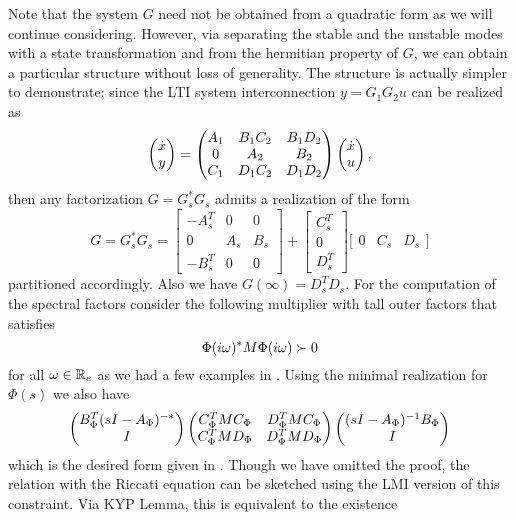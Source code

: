 Note that the system $G$ need not be obtained from a quadratic form as we will continue considering. However, via separating
the stable and the unstable modes with a state transformation and from the hermitian property of $G$, we can obtain a particular 
structure without loss of generality. The structure is actually simpler to demonstrate; since the LTI system interconnection 
$y=G_1G_2 u$ can be realized as
\begin{equation}
\begin{pmatrix}\dot{x}\\y\end{pmatrix} = \begin{pmatrix}A_1 &B_1C_2 &B_1D_2\\0 &A_2 &B_2\\C_1 &D_1C_2 &D_1D_2\end{pmatrix}\begin{pmatrix}\dot{x}\\u\end{pmatrix},
\end{equation}
then any factorization $G = G_s^*G_s$ admits a realization of the form
\begin{equation}
G = G_s^*G_s = \left[
\begin{array}{cc|c}
-A_s^T &0 &0\\0 &A_s &B_s\\\hline -B_s^T &0 &0	
\end{array}\right]+
\left[
\begin{array}{c}
C_s^T \\ 0 \\\hline D_s^T
\end{array}
\right]
\bigg[
\begin{array}{cc|c}
0 &C_s &D_s
\end{array}
\bigg]
\end{equation}
partitioned accordingly. Also we have $G(\infty)= D_s^TD_s$. For the computation of the spectral factors 
consider the following multiplier with tall outer factors that satisfies
\[
\Phi(i\omega)^*M\Phi(i\omega) \succ 0
\]
for all $\omega\in\mathbb{R}_e$ as we had a few examples in . Using the minimal realization for $\Phi(s)$ we also have
\begin{equation}
\begin{pmatrix}B_{\Phi}^T(sI-A_{\Phi})^{-*}\\I\end{pmatrix}
\begin{pmatrix}C_{\Phi}^TMC_{\Phi}&D_{\Phi}^TMC_{\Phi}\\C_{\Phi}^TMD_{\Phi}&D_{\Phi}^TMD_{\Phi}\end{pmatrix}
\begin{pmatrix}(sI-A_{\Phi})^{-1}B_{\Phi}\\I\end{pmatrix}
\label{eq:specfactshuffle}
\end{equation} which is the desired form given in . Though we have omitted the proof, the relation with the 
Riccati equation can be sketched using the LMI version of this constraint. Via KYP Lemma, this is equivalent to the existence 
